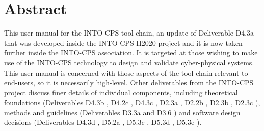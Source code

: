 \documentclass[a4paper,12pt,final]{include/intocpsassociation}   %
\newenvironment{assumption}{\noindent\smallskip\color{blue}\begin{framed}\begin{minipage}{0.95\columnwidth}}{\end{minipage}\end{framed}\smallskip\par}
\begin{document}
\maketitle
%
%
%
\section*{Abstract}
\label{sec:abstract}
%
This user manual for the INTO-CPS tool chain, an update of Deliverable D4.3a \cite{INTOCPSD4.3a} that was developed inside the INTO-CPS H2020 project and it is now taken further inside the INTO-CPS association.
%
It is targeted at those wishing to make use of the INTO-CPS technology to design and validate cyber-physical systems.
%
This user manual is concerned with those aspects of the tool chain relevant to end-users, so it is necessarily high-level.
%
Other deliverables from the INTO-CPS project discuss finer details of individual components, including theoretical foundations (Deliverables D4.3b \cite{INTOCPSD4.3b}, D4.2c \cite{INTOCPSD4.2c}, D4.3c \cite{INTOCPSD4.3c}, D2.3a \cite{INTOCPSD2.3a}, D2.2b \cite{INTOCPSD2.2b}, D2.3b \cite{INTOCPSD2.3b}, D2.3c \cite{INTOCPSD2.3c}), methods and guidelines (Deliverables D3.3a \cite{INTOCPSD3.3a} and D3.6 \cite{INTOCPSD3.6}) and software design decisions (Deliverables D4.3d \cite{INTOCPSD4.3d}, D5.2a \cite{INTOCPSD5.2a}, D5.3c \cite{INTOCPSD5.3c}, D5.3d \cite{INTOCPSD5.3d}, D5.3e \cite{INTOCPSD5.3e}).
%
\newpage
%
\tableofcontents
\newpage
%
%
%
%
%
%

\clearpage

\clearpage

\clearpage

\clearpage

\clearpage

\clearpage %

\clearpage

\clearpage %

\clearpage

\clearpage

\clearpage

\clearpage
%
%
%
%

 
\label{ch:bib} %
%
%
%
\clearpage
%
%
%
\appendix

\clearpage

\clearpage

%
%
%
\end{document}
